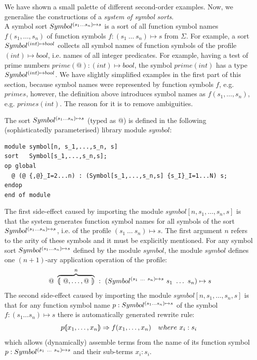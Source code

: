 \documentclass{article}
\begin{document}
{\bigskip

\noindent
We have shown a small palette of different second-order
examples. Now, we generalise the constructions of a 
{\em system of symbol sorts}. \\
A symbol sort $Symbol^{(s_1 \ldots s_n) \mapsto s}$ 
is a sort of all function symbol names $f(s_1, \ldots, s_n)$ of
function symbols $f : (s_1 ~ \ldots ~ s_n) \mapsto s$ from $\Sigma$.
For example, a sort $Symbol^{(int) \mapsto bool}$ 
collects all symbol names of function symbols of
the profile $(int) \mapsto bool$, i.e. names of all integer predicates. 
For example, having a test of prime numbers $prime(@): (int) \mapsto bool$,
the symbol $prime(int)$ has a type $Symbol^{(int) \mapsto bool}$.
We have slightly simplified examples in the first part of this section,
because symbol names were represented by function symbols $f$,
e.g. $primes$,
however, the definition above introduces symbol names as 
$f(s_1, \ldots, s_n)$, e.g. $primes(int)$. The reason for it is
to remove ambiguities.

The sort $Symbol^{(s_1 \ldots s_n) \mapsto s}$ 
(typed as \verb@Symbol[s_1,...,s_n,s]@) is defined in the following
(sophisticatedly parameterised) library module $symbol$:
%
{\small
\begin{verbatim}
module symbol[n, s_1,...,s_n, s]
sort   Symbol[s_1,...,s_n,s];
op global
  @ (@ {,@}_I=2...n) : (Symbol[s_1,...,s_n,s] {s_I}_I=1...N) s;
endop
end of module
\end{verbatim}}\noindent
The first side-effect caused by importing
the module $symbol[n,s_1,\ldots,s_n,s]$ is that the system generates
function symbol names for all symbols of the sort 
$Symbol^{(s_1 \ldots s_n) \mapsto s}$,
i.e. of the profile $(s_1 ~ \ldots ~ s_n) \mapsto s$. 
The first argument $n$ refers to the
arity of these symbols and it must be explicitly mentioned.
For any symbol sort $Symbol^{(s_1 \ldots s_n) \mapsto s}$ defined by the 
module $symbol$, the module $symbol$ defines 
one $(n+1)$-ary application operation of the profile:
\[
~@~ \overbrace{ ( {\kern -2pt} [ ~@, \ldots, @~ ] {\kern -2pt} ) }^{n} ~:~ 
    (Symbol^{(s_1~\ldots~s_n) \mapsto s}~s_1~\ldots~s_n)\mapsto s
\]
The second side-effect caused by importing
the module $symbol[n,s_1,\ldots,s_n,s]$ is that 
for any function symbol name $p : Symbol^{(s_1 \ldots s_n) \mapsto s}$ 
of the symbol $f : (s_1 \ldots s_n) \mapsto s$
there is automatically generated rewrite rule:
\[
p \lban x_1, \ldots, x_n \rban \rewrite f(x_1, \ldots, x_n) \quad       
                        where~x_i:s_i
\]
which allows (dynamically) assemble terms from the name of its 
function symbol
$p:Symbol^{(s_1~\ldots~s_n)\mapsto s}$ and their sub-terms $x_i:s_i$.

}
\end{document}
